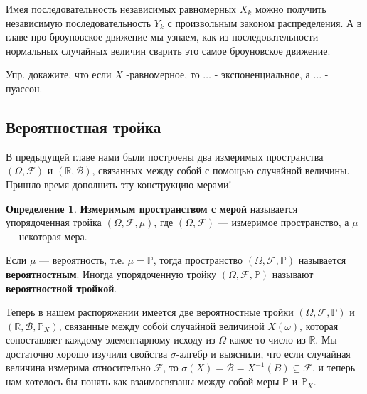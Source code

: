 \documentclass[pdftex, 12pt, a4paper]{article}
\def \mbb{\mathbb}
\def \PP{\mbb{P}}
\def\R{\ensuremath{\mathbb{R}}} %
\def\F{\ensuremath{\mathcal{F}}} %
\def\B{\ensuremath{\mathcal{B}}} %
\def\s{\ensuremath{\sigma}}
\def \Om{\Omega}
\def \om{\omega}
\theoremstyle{definition} %
\newtheorem*{mydef}{Определение}
\numberwithin{problem}{section}
\newcommand{\indef}[1]{\textbf{#1}}
\numberwithin{blits}{section}
\begin{document}
Имея последовательность независимых равномерных $X_{k}$ можно получить независимую последовательность $Y_{k}$ с произвольным законом распределения. А в главе про броуновское движение мы узнаем, как из последовательности нормальных случайных величин сварить это самое броуновское движение.

Упр. докажите, что если $X$ -равномерное, то $\ldots $ - экспоненциальное, а $\ldots $ - пуассон.







\subsection{Вероятностная тройка}

В предыдущей главе нами были построены два измеримых пространства $(\Om,\F)$ и $(\R,\B)$, связанных между собой с помощью случайной величины. Пришло время дополнить эту конструкцию мерами!

\begin{mydef} 
\indef{Измеримым пространством с мерой} называется упорядоченная тройка $(\Om,\F,\mu)$, где $(\Om,\F)$ --- измеримое пространство, а $\mu$ --- некоторая мера. 

Если $\mu$ --- вероятность, т.е. $\mu = \PP$, тогда пространство $(\Om,\F,\PP)$ называется \indef{вероятностным}. Иногда упорядоченную тройку  $(\Om,\F,\PP)$ называют \indef{вероятностной тройкой}. 
 
\end{mydef}

Теперь в нашем распоряжении имеется две вероятностные тройки $(\Om, \F, \PP)$ и $(\R,\B,\PP_X)$, связанные между собой случайной величиной $X(\om)$, которая сопоставляет каждому элементарному исходу из $\Om$ какое-то число из $\R$. Мы достаточно хорошо изучили свойства \s-алгебр и выяснили, что если случайная величина измерима относительно $\F$, то $\s(X)= \B = X^{-1}(B) \subseteq \F$, и теперь нам хотелось бы понять как взаимосвязаны между собой меры $\PP$ и $\PP_X$. 
\end{document}
